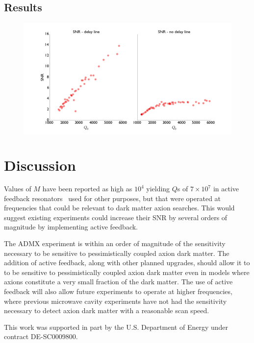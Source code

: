 \documentclass[aps,prl,twocolumn,groupedaddress]{revtex4-1}
\begin{document}
\subsection{Results}

\begin{figure}[htbp]
\centering
\includegraphics[width=\textwidth]{figs/summary_plots}
\caption{}
\label{fig:summary_plots}
\end{figure}

\section{Discussion}
Values of $M$ have been reported as high as $10^4$ yielding $Q$s of $7\times10^7$ in active feedback resonators~\cite{:/content/aip/journal/rsi/84/8/10.1063/1.4817537} used for other purposes, but that were operated at frequencies that could be relevant to dark matter axion searches.
This would suggest existing experiments could increase their SNR by several orders of magnitude by implementing active feedback.

The ADMX experiment is within an order of magnitude of the sensitivity necessary to be sensitive to pessimistically coupled axion dark matter.  The addition of active feedback, along with other planned upgrades, should allow it to to be sensitive to pessimistically coupled axion dark matter even in models where axions constitute a very small fraction of the dark matter.  The use of active feedback will also allow future experiments to operate at higher frequencies, where previous microwave cavity experiments have not had the sensitivity necessary to detect axion dark matter with a reasonable scan speed.

This work was supported in part by the U.S. Department of Energy under contract DE-SC0009800.


\end{document}
